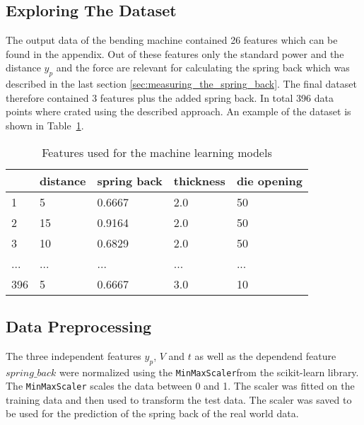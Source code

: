 \subsection{Exploring The Dataset}
The output data of the bending machine contained 26 features which can be found in the appendix. Out of these features only the standard power and the distance $y_p$ and the force are relevant for calculating the spring back which was described in the last section \ref{sec:measuring_the_spring_back}.
The final dataset therefore contained 3 features plus the added spring back.
In total 396 data points where crated using the described approach.
An example of the dataset is shown in Table~\ref{tab:dataset_example}.

\begin{table}[H]
    \centering
    \begin{tabular}{|l|l|l|l|l|}
        \hline
        \textbf{} & \textbf{distance} & \textbf{spring back} & \textbf{thickness} & \textbf{die opening} \\ \hline
        1         & 5                 & 0.6667               & 2.0                & 50                   \\
        2         & 15                & 0.9164               & 2.0                & 50                   \\
        3         & 10                & 0.6829               & 2.0                & 50                   \\
        ...       & ...               & ...                  & ...                & ...                  \\
        396       & 5                 & 0.6667               & 3.0                & 10                   \\
        \hline
    \end{tabular}
    \caption{Features used for the machine learning models}
    \label{tab:dataset_example}
\end{table}


\subsection{Data Preprocessing}

The three independent features $y_p$, $V$ and $t$ as well as the dependend feature $spring\_back$ were normalized using the \texttt{MinMaxScaler}from the scikit-learn library. The \texttt{MinMaxScaler} scales the data between 0 and 1. The scaler was fitted on the training data and then used to transform the test data. The scaler was saved to be used for the prediction of the spring back of the real world data.

